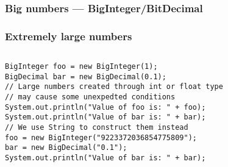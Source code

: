 \documentclass[en, 11pt, xcolor=dvipsnames]{beamer}
\begin{document}
\subsubsection{Big numbers --- BigInteger/BitDecimal}
\begin{frame}[fragile]
	\frametitle{Extremely large numbers}


	\begin{columns}[c]
		\begin{column}{0.9\textwidth}

			\begin{lstlisting}[style=Java]
BigInteger foo = new BigInteger(1);
BigDecimal bar = new BigDecimal(0.1);
// Large numbers created through int or float type
// may cause some unexpedted conditions
System.out.println("Value of foo is: " + foo);
System.out.println("Value of bar is: " + bar);
// We use String to construct them instead
foo = new BigInteger("9223372036854775809");
bar = new BigDecimal("0.1");
System.out.println("Value of bar is: " + bar);\end{lstlisting}

		\end{column}
	\end{columns}

\end{frame}
\end{document}
